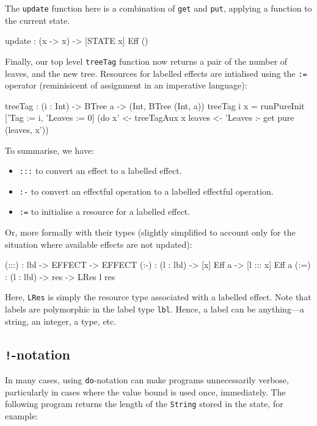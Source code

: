 \noindent
The \texttt{update} function here is a combination of \texttt{get} and \texttt{put},
applying a function to the current state.

\begin{code}
update : (x -> x) -> { [STATE x] } Eff () 
\end{code}

\noindent
Finally, our top level \texttt{treeTag} function now returns a pair of
the number of leaves, and the new tree. Resources for labelled effects are
intialised using the \texttt{:=} operator (reminisicent of assignment in
an imperative language):

\begin{code}
treeTag : (i : Int) -> BTree a -> (Int, BTree (Int, a))
treeTag i x = runPureInit ['Tag := i, 'Leaves := 0]
                    (do x' <- treeTagAux x
                        leaves <- 'Leaves :- get
                        pure (leaves, x'))
\end{code}

\noindent
To summarise, we have:

\begin{itemize}
\item \texttt{:::} to convert an effect to a labelled effect.
\item \texttt{:-} to convert an effectful operation to a labelled effectful operation.
\item \texttt{:=} to initialise a resource for a labelled effect.
\end{itemize}

\noindent
Or, more formally with their types (slightly simplified to account only for
the situation where available effects are not updated):

\begin{code}
(:::) : lbl -> EFFECT -> EFFECT
(:-)  : (l : lbl) -> { [x] } Eff a -> { [l ::: x] } Eff a
(:=)  : (l : lbl) -> res -> LRes l res
\end{code}

\noindent
Here, \texttt{LRes} is simply the resource type associated with a labelled
effect. Note that labels are polymorphic in the label type \texttt{lbl}. 
Hence, a label can be anything---a string, an integer, a type, etc.

\subsection{\texttt{!}-notation}

In many cases, using \texttt{do}-notation can make programs unnecessarily
verbose, particularly in cases where the value
bound is used once, immediately. The following program returns the length of
the \texttt{String} stored in the state, for example:

